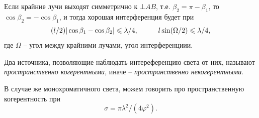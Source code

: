 Если крайние лучи выходят симметрично к $\bot AB$, т.е. $\beta_2 = \pi-\beta_1$, то $\cos \beta_2 = - \cos \beta_1$, и тогда хорошая интерференция будет при
\begin{equation*}
    (l/2) |\cos\beta_1-\cos \beta_2| \leq \lambda/4,
    \hspace{10 mm} 
    l \sin (\Omega/2) \leq \lambda/4,
\end{equation*}
где $\Omega$ -- угол между крайними лучами, угол интерференциии. 


\begin{to_def}
    Два источника, позволяющие наблюдать интереференцию света от них, называют \textit{пространственно когерентными}, иначе -- \textit{пространственно некогерентными}. 
\end{to_def}

В случае же монохроматичного света, можем говорить про пространственную когерентность при 
\begin{equation*}
    \sigma =\pi \lambda^2 / (4 \varphi^2). 
\end{equation*}